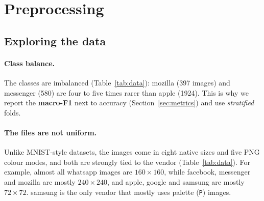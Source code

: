 \documentclass[11pt,a4paper]{article}
\newcommand{\code}[1]{\texttt{\small #1}}
\newcommand{\vendor}[1]{\textsf{#1}}
\begin{document}
\section{Preprocessing}
\label{sec:prepro}

\subsection{Exploring the data}

\paragraph{Class balance.} The classes are imbalanced (Table~\ref{tab:data}): \vendor{mozilla} (397
images) and \vendor{messenger} (580) are four to five times rarer than \vendor{apple} (\num{1924}).
This is why we report the \textbf{macro-F1} next to accuracy (Section~\ref{sec:metrics}) and use
\emph{stratified} folds.

\paragraph{The files are not uniform.} Unlike MNIST-style datasets, the images come in eight native sizes
and five PNG colour modes, and both are strongly tied to the vendor (Table~\ref{tab:data}). For example,
almost all \vendor{whatsapp} images are $160\times160$, while \vendor{facebook}, \vendor{messenger} and
\vendor{mozilla} are mostly $240\times240$, and \vendor{apple}, \vendor{google} and \vendor{samsung} are
mostly $72\times72$. \vendor{samsung} is the only vendor that mostly uses palette (\code{P}) images.
\end{document}

